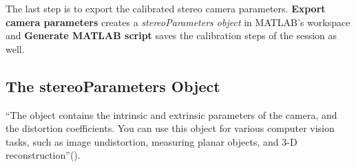 The last step is to export the calibrated stereo camera parameters. \textbf{Export camera parameters} creates a \textit{stereoParameters object} in MATLAB's workspace and \textbf{Generate MATLAB script} saves the calibration steps of the session as well.

\subsection{The stereoParameters Object}\label{ssec:stereoParamsObj}
\enquote{The object contains the intrinsic and extrinsic parameters of the camera, and the distortion coefficients. You can use this object for various computer vision tasks, such as image undistortion, measuring planar objects, and 3-D reconstruction}(\cite{StereoCalib.2016}).